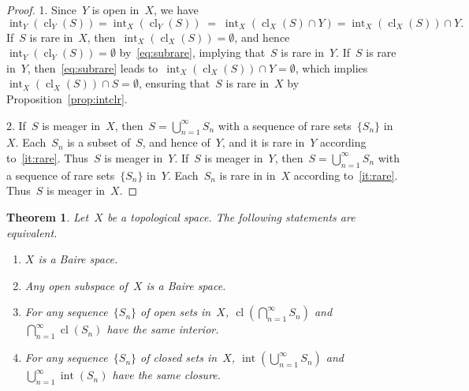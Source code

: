 \documentclass[11pt,a4paper]{article}
\newtheorem{theorem}{Theorem}[section]
\theoremstyle{definition}
\DeclareMathOperator{\inter}{int}
\DeclareMathOperator{\cl}{cl}
\numberwithin{equation}{section}
\begin{document}
\begin{proof} 
  1. Since~$Y$ is open in~$X$, we have
 \begin{equation}
   \label{eq:subrare}
     \inter_Y(\cl_Y(S)) = \inter_X(\cl_Y(S)) \;=\; \inter_X(\cl_X(S)\cap Y) = \inter_X(\cl_X(S))\cap Y.
 \end{equation}
   If~$S$ is rare in~$X$, then~$\inter_X(\cl_X(S))=\emptyset$, and hence~$\inter_Y(\cl_Y(S))
   = \emptyset$ by~\eqref{eq:subrare}, 
   implying that~$S$ is rare in~$Y$. 
   If~$S$ is rare in~$Y$, then~\eqref{eq:subrare} leads
   to~$\inter_{X}(\cl_X(S))\cap Y = \emptyset$, which implies~$\inter_X(\cl_X(S))\cap
   S = \emptyset$,  ensuring that~$S$ is rare in~$X$ by Proposition~\ref{prop:intclr}.

   2. If~$S$ is meager in~$X$, then~$S= \bigcup_{n=1}^\infty S_n$ with a sequence of rare
   sets~$\{S_n\}$ in~$X$. Each~$S_n$ is a subset of~$S$, and hence of~$Y$, and it is rare
   in~$Y$ according to~\ref{it:rare}. Thus~$S$ is meager in~$Y$. If~$S$ is meager in~$Y$, then~$S
   = \bigcup_{n=1}^\infty S_n$ with a sequence of rare sets~$\{S_n\}$ in~$Y$. Each~$S_n$ is rare in
   in~$X$ according to~\ref{it:rare}. Thus~$S$ is meager in~$X$. 
\end{proof}


\begin{theorem}
  \label{th:intcl}
   Let~$X$ be a topological space. The following statements are equivalent.  
   \begin{enumerate}
     \item $X$ is a Baire space.
     \item Any open subspace of~$X$ is a Baire space. 
     \item For any sequence~$\{S_n\}$ of open sets in~$X$, $\cl(\bigcap_{n=1}^\infty S_n)$ and
       $\bigcap_{n=1}^\infty \cl(S_n)$ have the same interior. 
     \item For any sequence~$\{S_n\}$ of closed sets in~$X$, $\inter(\bigcup_{n=1}^\infty S_n)$ and
       $\bigcup_{n=1}^\infty \inter(S_n)$ have the same closure. 
   \end{enumerate}
\end{theorem}
\end{document}
